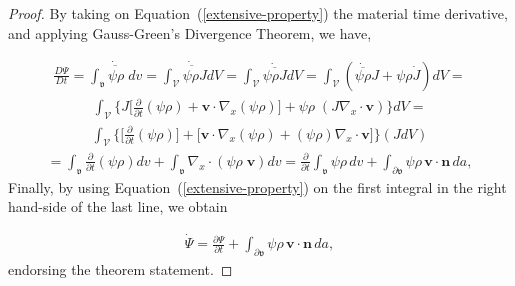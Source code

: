 \begin{proof}
By taking on Equation~(\ref{extensive-property}) the material time
derivative, and applying Gauss-Green's Divergence Theorem, we have,

\begin{align*}
\frac{D\Psi}{Dt}=\dot{\overline{\int_{\mathfrak{v}}\psi\rho\;dv}}=
\dot{\overline{\int_{\mathscr{V}}\psi\rho{J}dV}}=
\int_{\mathscr{V}}\dot{\overline{\psi\rho{J}}}dV=
\int_{\mathscr{V}}(\dot{\overline{\psi\rho}}J+\psi\rho\dot{J})dV=
\end{align*}
\begin{align*}
\int_{\mathscr{V}}\Big\{J\Big[\frac{\partial}{\partial{t}}(\psi\rho)+
  \mathbf{v}\!\cdot\!\nabla_x(\psi\rho)\Big]+
\psi\rho\;(J\nabla_x\!\cdot\!\mathbf{v})\Big\}dV=
\end{align*}
\begin{align*}
\int_{\mathscr{V}}\Big\{\Big[\frac{\partial}{\partial{t}}(\psi\rho)\Big]
+\big[\mathbf{v}\!\cdot\!\nabla_x(\psi\rho)+
  (\psi\rho)\nabla_x\!\cdot\!\mathbf{v}\big]\Big\}(JdV)
\end{align*}
\begin{align*}
=\int_{\mathfrak{v}}\frac{\partial}{\partial{t}}(\psi\rho)dv+
\int_{\mathfrak{v}}\nabla_x\!\cdot\!(\psi\rho\;\mathbf{v})dv=
\frac{\partial}{\partial{t}}\int_{\mathfrak{v}}\psi\rho\,dv+
\int_{\partial\mathfrak{v}}\psi\rho\,\mathbf{v}\!\cdot\!\mathbf{n}\,da,
\end{align*}
Finally, by using Equation~(\ref{extensive-property}) on the first
integral in the right hand-side of the last line, we obtain

\begin{align}
\dot{\Psi}=\frac{\partial\Psi}{\partial{t}}+
\int_{\partial\mathfrak{v}}\psi\rho\,\mathbf{v}\!\cdot\!\mathbf{n}\,da,
\end{align}
endorsing the theorem statement.
\end{proof}
